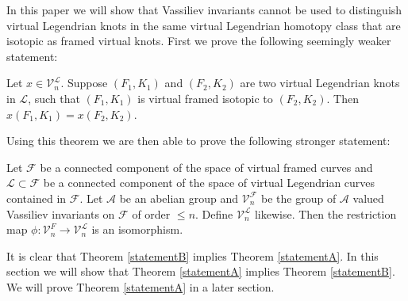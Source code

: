 In this paper we will show that Vassiliev invariants cannot be used to distinguish virtual Legendrian knots in the same virtual Legendrian homotopy class that are isotopic as framed virtual knots.  First we prove the following seemingly weaker statement:

\begin{thm} \label{statementA}
Let $x\in \mathcal{V}_n^\mathcal{L}$.  Suppose $(F_1, K_1)$ and $(F_2, K_2)$ are two virtual Legendrian knots in $ \mathcal{L}$, such that $(F_1, K_1)$ is virtual framed isotopic to $(F_2, K_2)$.   Then $x(F_1, K_1) = x(F_2, K_2)$.
\end{thm}

Using this theorem we are then able to prove the following stronger statement:

\begin{thm} \label{statementB}
Let $\mathcal{F}$ be a connected component of the space of virtual framed curves and $\mathcal{L}\subset\mathcal{F}$ be a connected component of the space of virtual Legendrian curves contained in $\mathcal{F}$.  Let $\mathcal{A}$ be an abelian group and $\mathcal{V}_n^\mathcal{F}$ be the group of $\mathcal{A}$ valued Vassiliev invariants on $\mathcal{F}$ of order $\leq n$.  Define $\mathcal{V}_n^\mathcal{L}$ likewise.  Then the restriction map $\phi:\mathcal{V}_n^{F}\rightarrow\mathcal{V}_n^\mathcal{L}$ is an isomorphism.
\end{thm}



It is clear that Theorem \ref{statementB} implies Theorem \ref{statementA}.  In this section we will show that Theorem \ref{statementA} implies Theorem \ref{statementB}.  We will prove Theorem \ref{statementA} in a later section.

